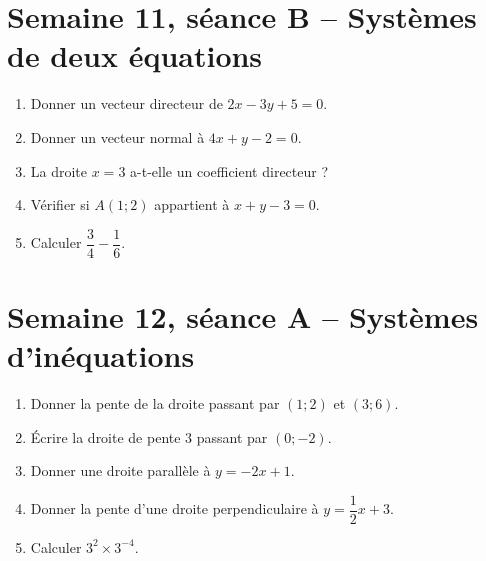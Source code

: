 \section{Semaine 11, séance B -- Systèmes de deux équations}
\begin{enumerate}
  \item Donner un vecteur directeur de $2x-3y+5=0$.
  \item Donner un vecteur normal à $4x+y-2=0$.
  \item La droite $x=3$ a-t-elle un coefficient directeur ?
  \item Vérifier si $A(1;2)$ appartient à $x+y-3=0$.
  \item Calculer $\dfrac34-\dfrac16$.
\end{enumerate}

\section{Semaine 12, séance A -- Systèmes d'inéquations}
\begin{enumerate}
  \item Donner la pente de la droite passant par $(1;2)$ et $(3;6)$.
  \item Écrire la droite de pente $3$ passant par $(0;-2)$.
  \item Donner une droite parallèle à $y=-2x+1$.
  \item Donner la pente d'une droite perpendiculaire à $y=\dfrac12x+3$.
  \item Calculer $3^2\times3^{-4}$.
\end{enumerate}

